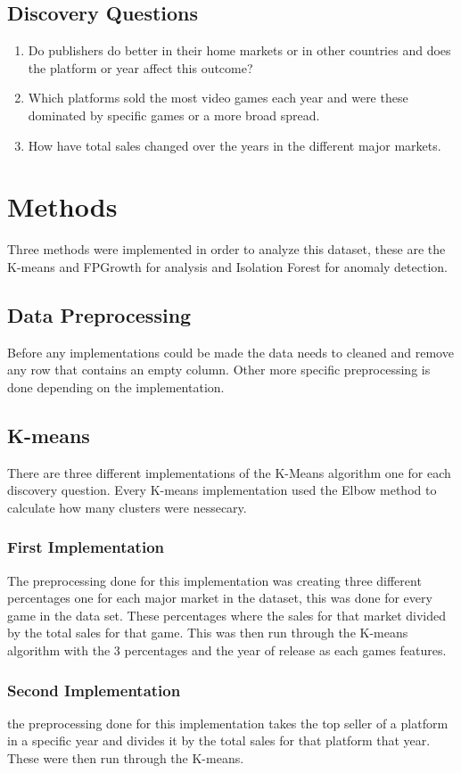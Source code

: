 \documentclass[conference]{IEEEtran}
\begin{document}
\subsection{Discovery Questions}
\begin{enumerate}
    \item Do publishers do better in their home markets or in
other countries and does the platform or year affect this
outcome? 
    \item Which platforms sold the most video games each year
and were these dominated by specific games or a more
broad spread. 
    \item How have total sales changed over the years in the
different major markets.
\end{enumerate}
\section{Methods}
Three methods were implemented in order to analyze this dataset, these are the K-means and FPGrowth for analysis and Isolation Forest for anomaly detection.
\subsection{Data Preprocessing}
Before any implementations could be made the data needs to cleaned and remove any row that contains an empty column. Other more specific preprocessing is done depending on the implementation.
\subsection{K-means}
There are three different implementations of the K-Means algorithm one for each discovery question. Every K-means implementation used the Elbow method to calculate how many clusters were nessecary.
\subsubsection{First Implementation}
The preprocessing done for this implementation was creating three different percentages  one for each major market in the dataset, this was done for every game in the data set. These percentages where the sales for that market divided by the total sales for that game. This was then run through the K-means algorithm with the 3 percentages and the year of release as each games features.
\subsubsection{Second Implementation}
the preprocessing done for this implementation takes the top seller of a platform in a specific year and divides it by the total sales for that platform that year. These were then run through the K-means.
\end{document}
